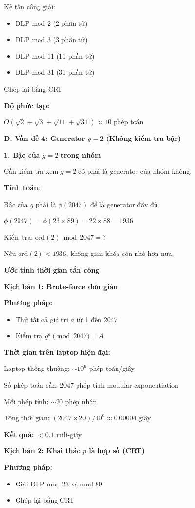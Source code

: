 Kẻ tấn công giải:
\begin{itemize}
    \item DLP mod 2 (2 phần tử)
    \item DLP mod 3 (3 phần tử)
    \item DLP mod 11 (11 phần tử)
    \item DLP mod 31 (31 phần tử)
\end{itemize}

Ghép lại bằng CRT

\textbf{Độ phức tạp:}

$O(\sqrt{2} + \sqrt{3} + \sqrt{11} + \sqrt{31}) \approx 10$ phép toán

\textbf{D. Vấn đề 4: Generator $g = 2$ (Không kiểm tra bậc)}

\textbf{1. Bậc của $g = 2$ trong nhóm}

Cần kiểm tra xem $g = 2$ có phải là generator của nhóm không.

\textbf{Tính toán:}

Bậc của $g$ phải là $\phi(2047)$ để là generator đầy đủ

$\phi(2047) = \phi(23 \times 89) = 22 \times 88 = 1936$

Kiểm tra: $\text{ord}(2) \bmod 2047 = ?$

Nếu $\text{ord}(2) < 1936$, không gian khóa còn nhỏ hơn nữa.

\textbf{Ước tính thời gian tấn công}

\textbf{Kịch bản 1: Brute-force đơn giản}

\textbf{Phương pháp:}
\begin{itemize}
    \item Thử tất cả giá trị $a$ từ 1 đến 2047
    \item Kiểm tra $g^a \pmod{2047} = A$
\end{itemize}

\textbf{Thời gian trên laptop hiện đại:}

Laptop thông thường: $\sim 10^9$ phép toán/giây

Số phép toán cần: 2047 phép tính modular exponentiation

Mỗi phép tính: $\sim 20$ phép nhân

Tổng thời gian: $(2047 \times 20) / 10^9 \approx 0.00004$ giây

\textbf{Kết quả:} $< 0.1$ mili-giây

\textbf{Kịch bản 2: Khai thác $p$ là hợp số (CRT)}

\textbf{Phương pháp:}
\begin{itemize}
    \item Giải DLP mod 23 và mod 89
    \item Ghép lại bằng CRT
\end{itemize}

